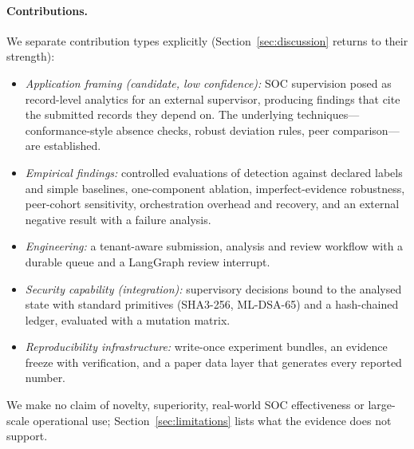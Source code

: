 \paragraph{Contributions.}
We separate contribution types explicitly (Section~\ref{sec:discussion} returns to
their strength):
\begin{itemize}
\item \emph{Application framing (candidate, low confidence):} SOC supervision posed as
  record-level analytics for an external supervisor, producing findings that cite
  the submitted records they depend on. The underlying techniques---conformance-style
  absence checks, robust deviation rules, peer comparison---are established.
\item \emph{Empirical findings:} controlled evaluations of detection against declared
  labels and simple baselines, one-component ablation, imperfect-evidence robustness,
  peer-cohort sensitivity, orchestration overhead and recovery, and an external
  negative result with a failure analysis.
\item \emph{Engineering:} a tenant-aware submission, analysis and review workflow with
  a durable queue and a LangGraph review interrupt.
\item \emph{Security capability (integration):} supervisory decisions bound to the
  analysed state with standard primitives (SHA3-256, ML-DSA-65) and a hash-chained
  ledger, evaluated with a mutation matrix.
\item \emph{Reproducibility infrastructure:} write-once experiment bundles, an evidence
  freeze with verification, and a paper data layer that generates every reported
  number.
\end{itemize}

We make no claim of novelty, superiority, real-world SOC effectiveness or
large-scale operational use; Section~\ref{sec:limitations} lists what the evidence
does not support.

